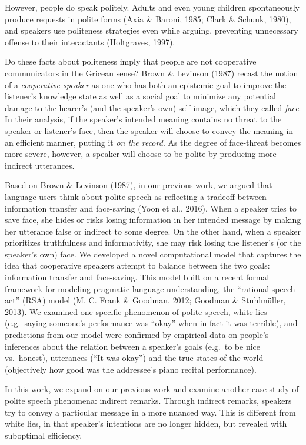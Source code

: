 \documentclass[10pt, letterpaper]{article}
\begin{document}
However, people do speak politely. Adults and even young children
spontaneously produce requests in polite forms (Axia \& Baroni, 1985;
Clark \& Schunk, 1980), and speakers use politeness strategies even
while arguing, preventing unnecessary offense to their interactants
(Holtgraves, 1997).

Do these facts about politeness imply that people are not cooperative
communicators in the Gricean sense? Brown \& Levinson (1987) recast the
notion of a \emph{cooperative speaker} as one who has both an epistemic
goal to improve the listener's knowledge state as well as a social goal
to minimize any potential damage to the hearer's (and the speaker's own)
self-image, which they called \emph{face}. In their analysis, if the
speaker's intended meaning contains no threat to the speaker or
listener's face, then the speaker will choose to convey the meaning in
an efficient manner, putting it \emph{on the record}. As the degree of
face-threat becomes more severe, however, a speaker will choose to be
polite by producing more indirect utterances.

Based on Brown \& Levinson (1987), in our previous work, we argued that
language users think about polite speech as reflecting a tradeoff
between information transfer and face-saving (Yoon et al., 2016). When a
speaker tries to save face, she hides or risks losing information in her
intended message by making her utterance false or indirect to some
degree. On the other hand, when a speaker prioritizes truthfulness and
informativity, she may risk losing the listener's (or the speaker's own)
face. We developed a novel computational model that captures the idea
that cooperative speakers attempt to balance between the two goals:
information transfer and face-saving. This model built on a recent
formal framework for modeling pragmatic language understanding, the
``rational speech act'' (RSA) model (M. C. Frank \& Goodman, 2012;
Goodman \& Stuhlmüller, 2013). We examined one specific phenomenon of
polite speech, white lies (e.g.~saying someone's performance was
``okay'' when in fact it was terrible), and predictions from our model
were confirmed by empirical data on people's inferences about the
relation between a speaker's goals (e.g.~to be nice vs.~honest),
utterances (``It was okay'') and the true states of the world
(objectively how good was the addressee's piano recital performance).

In this work, we expand on our previous work and examine another case
study of polite speech phenomena: indirect remarks. Through indirect
remarks, speakers try to convey a particular message in a more nuanced
way. This is different from white lies, in that speaker's intentions are
no longer hidden, but revealed with suboptimal efficiency.
\end{document}
